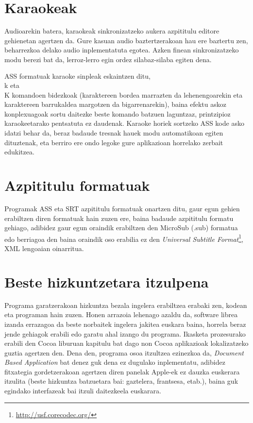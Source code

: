\section{Karaokeak}
Audioarekin batera, karaokeak sinkronizatzeko aukera azpititulu editore gehienetan agertzen da. Gure kasuan audio baztertzerakoan hau ere baztertu zen, beharrezkoa delako audio inplementatuta egotea. Azken finean sinkronizatzeko modu berezi bat da, lerroz-lerro egin ordez silabaz-silaba egiten dena.

ASS formatuak karaoke sinpleak eskaintzen ditu, \\k eta \\K komandoen bidezkoak (karaktereen bordea marrazten da lehenengoarekin eta karaktereen barrukaldea margotzen da bigarrenarekin), baina efektu askoz konplexuagoak sortu daitezke beste komando batzuen laguntzaz, printzipioz karaokeetarako pentsatuta ez daudenak. Karaoke horiek sortzeko ASS kode asko idatzi behar da, beraz badaude tresnak hauek modu automatikoan egiten dituztenak, eta berriro ere ondo legoke gure aplikazioan horrelako zerbait edukitzea.

\section{Azpititulu formatuak}
Programak ASS eta SRT azpititulu formatuak onartzen ditu, gaur egun gehien erabiltzen diren formatuak hain zuzen ere, baina badaude azpititulu formatu gehiago, adibidez gaur egun oraindik erabiltzen den MicroSub (.sub) formatua edo berriagoa den baina oraindik oso erabilia ez den \textit{Universal Subtitle Format}\footnote{\url{http://usf.corecodec.org/}}, XML lengoaian oinarritua.

\section{Beste hizkuntzetara itzulpena}
Programa garatzerakoan hizkuntza bezala ingelera erabiltzea erabaki zen, kodean eta programan hain zuzen. Honen arrazoia lehenago azaldu da, software librea izanda errazagoa da beste norbaitek ingelera jakitea euskara baina, horrela beraz jende gehiagok erabili edo garatu ahal izango du programa. Ikasketa prozesurako erabili den Cocoa liburuan\cite{hi:08} kapitulu bat dago non Cocoa aplikazioak lokalizatzeko guztia agertzen den. Dena den, programa osoa itzultzea ezinezkoa da, \textit{Document Based Application} bat denez guk dena ez dugulako inplementatu, adibidez fitxategia gordetzerakoan agertzen diren panelak Apple-ek ez dauzka euskerara itzulita (beste hizkuntza batzuetara bai: gaztelera, frantsesa, etab.), baina guk egindako interfazeak bai itzuli daitezkeela euskarara.

